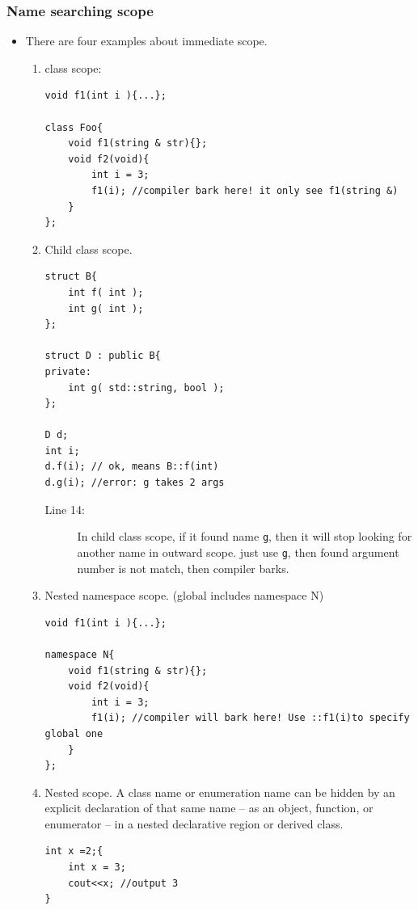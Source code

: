\documentclass[a4paper,11pt,twoside]{book}
\begin{document}
\subsubsection{Name searching scope}
\begin{itemize}
	
	\item There are four examples about immediate scope.
	\begin{enumerate}
		\item class scope:
\begin{lstlisting}
void f1(int i ){...};

class Foo{
	void f1(string & str){};
	void f2(void){
		int i = 3;
		f1(i); //compiler bark here! it only see f1(string &)
	}
};
\end{lstlisting}
		
		\item Child class scope. 
\begin{lstlisting}
struct B{
	int f( int );
	int g( int );
};
		
struct D : public B{
private:
	int g( std::string, bool );
};
		
D d;
int i;
d.f(i); // ok, means B::f(int)
d.g(i); //error: g takes 2 args
\end{lstlisting}
\begin{description}
	\item[Line 14:] In child class scope, if it found name \texttt{g}, then it will stop looking for another name in outward scope. just use \texttt{g}, then found argument number is not match, then compiler barks.
\end{description}
		
\item Nested namespace scope. (global includes namespace N)
\begin{lstlisting}
void f1(int i ){...};

namespace N{
	void f1(string & str){};
	void f2(void){
		int i = 3;
		f1(i); //compiler will bark here! Use ::f1(i)to specify global one
	}
};
\end{lstlisting}

		\item Nested scope. A class name or enumeration name can be hidden by an explicit declaration of that same name -- as an object, function, or enumerator -- in a nested declarative region or derived class.
\begin{lstlisting}[numbers=none]
int x =2;{
	int x = 3; 
	cout<<x; //output 3
}
\end{lstlisting}
		

\end{enumerate}
\end{itemize}
\end{document}

